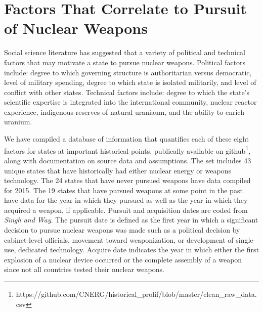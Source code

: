 \section{Factors That Correlate to Pursuit of Nuclear Weapons}
\label{s_factors}

Social science literature has suggested that a variety of political and technical factors that may motivate a state to pursue nuclear weapons\cite{bell_questioning_2013, singh_correlates_2004, montgomery_perils_2009, li_model-based_2010, hymans_achieving_2012}. Political factors include: degree to which governing structure is authoritarian versus democratic, level of military spending, degree to which state is isolated militarily, and level of conflict with other states. Technical factors include: degree to which the state's scientific expertise is integrated into the international community, nuclear reactor experience, indigenous reserves of natural uraniaum, and the ability to enrich uranium.

We have compiled a database of information that quantifies each of these eight factors for states at important historical points, publically available on github\footnote{https://github.com/CNERG/historical\_prolif/blob/master/clean\_raw\_data.csv}, along with documentation on source data and assumptions\cite{hist_prolif}. The set includes 43 unique states that have historically had either nuclear energy or weapons technology.  The 24 states that have never pursued weapons have data compiled for 2015. The 19 states that have pursued weapons at some point in the past have data for the year in which they pursued as well as the year in which they acquired a weapon, if applicable. Pursuit and acquisition dates are coded from \emph{Singh and Way}. The pursuit date is defined as the first year in which a significant decision to pursue nuclear weapons was made such as a political decision by cabinet-level officials, movement toward weaponization, or development of single-use, dedicated technology.  Acquire date indicates the year in which either the first explosion of a nuclear device occurred or the complete assembly of a weapon since not all countries tested their nuclear weapons.

